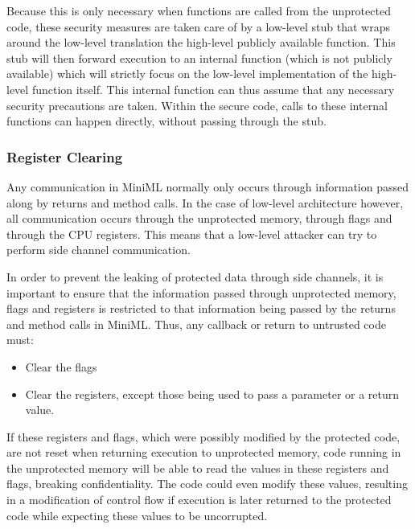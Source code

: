Because this is only necessary when functions are called from the unprotected code, these security measures are taken care of by a low-level stub that wraps around the low-level translation the high-level publicly available function.
This stub will then forward execution to an internal function (which is not publicly available) which will strictly focus on the low-level implementation of the high-level function itself.
This internal function can thus assume that any necessary security precautions are taken.
Within the secure code, calls to these internal functions can happen directly, without passing through the stub.

\subsubsection{Register Clearing}
Any communication in \mbox{MiniML} normally only occurs through information passed along by returns and method calls.
In the case of low-level architecture however, all communication occurs through the unprotected memory, through flags and through the CPU registers.
This means that a low-level attacker can try to perform side channel communication.

In order to prevent the leaking of protected data through side channels, it is important to ensure that the information passed through unprotected memory, flags and registers is restricted to that information being passed by the returns and method calls in \mbox{MiniML}.
Thus, any callback or return to untrusted code must: %
\begin{itemize}
\item Clear the flags
\item Clear the registers, except those being used to pass a parameter or a return value.
\end{itemize}

If these registers and flags, which were possibly modified by the protected code, are not reset when returning execution to unprotected memory, code running in the unprotected memory will be able to read the values in these registers and flags, breaking confidentiality. The code could even modify these values, resulting in a modification of control flow if execution is later returned to the protected code while expecting these values to be uncorrupted.


